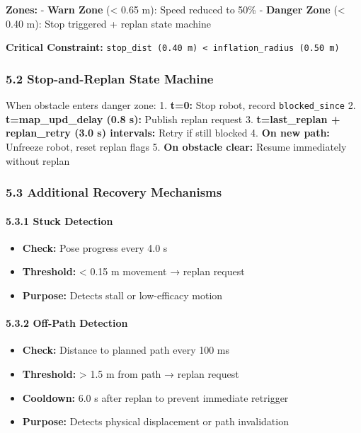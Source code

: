 \textbf{Zones:} - \textbf{Warn Zone} (\textless{} 0.65 m): Speed reduced
to 50\% - \textbf{Danger Zone} (\textless{} 0.40 m): Stop triggered +
replan state machine

\textbf{Critical Constraint:}
\texttt{stop\_dist\ (0.40\ m)\ \textless{}\ inflation\_radius\ (0.50\ m)}

\hypertarget{stop-and-replan-state-machine}{%
\subsubsection{5.2 Stop-and-Replan State
Machine}\label{stop-and-replan-state-machine}}

When obstacle enters danger zone: 1. \textbf{t=0:} Stop robot, record
\texttt{blocked\_since} 2. \textbf{t=map\_upd\_delay (0.8 s):} Publish
replan request 3. \textbf{t=last\_replan + replan\_retry (3.0 s)
intervals:} Retry if still blocked 4. \textbf{On new path:} Unfreeze
robot, reset replan flags 5. \textbf{On obstacle clear:} Resume
immediately without replan

\hypertarget{additional-recovery-mechanisms}{%
\subsubsection{5.3 Additional Recovery
Mechanisms}\label{additional-recovery-mechanisms}}

\hypertarget{stuck-detection}{%
\paragraph{5.3.1 Stuck Detection}\label{stuck-detection}}

\begin{itemize}
\tightlist
\item
  \textbf{Check:} Pose progress every 4.0 s
\item
  \textbf{Threshold:} \textless{} 0.15 m movement → replan request
\item
  \textbf{Purpose:} Detects stall or low-efficacy motion
\end{itemize}

\hypertarget{off-path-detection}{%
\paragraph{5.3.2 Off-Path Detection}\label{off-path-detection}}

\begin{itemize}
\tightlist
\item
  \textbf{Check:} Distance to planned path every 100 ms
\item
  \textbf{Threshold:} \textgreater{} 1.5 m from path → replan request
\item
  \textbf{Cooldown:} 6.0 s after replan to prevent immediate retrigger
\item
  \textbf{Purpose:} Detects physical displacement or path invalidation
\end{itemize}

